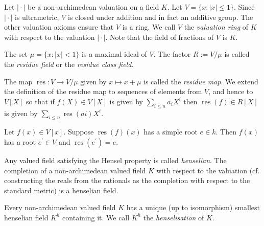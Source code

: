 \documentclass[12pt]{article}
\newcommand{\PR}{^{\prime}}
\DeclareMathOperator{\res}{res}
\newcommand{\val}{|\!\cdot\!|}
\begin{document}
Let $\val$ be a non-archimedean valuation on a field $K$.  Let
$V=\{x:|x|\le 1\}$.  Since $\val$ is ultrametric, $V$ is closed under
addition and in fact an additive group.  The other valuation axioms
ensure that $V$ is a ring.  We call $V$ the \emph{valuation ring} of
$K$ with respect to the valuation $\val$.  Note that the field of
fractions of $V$ is $K$.

The set $\mu=\{x:|x|<1\}$ is a maximal ideal of $V$.  The factor
$R:=V/\mu$ is called the \emph{residue field} or the \emph{residue
class field}.

The map $\res:V \to V/\mu$ given by $x \mapsto x+\mu$ is called the
\emph{residue map}. We extend the definition of the residue map to
sequences of elements from $V$, and hence to $V[X]$ so that if $f(X)
\in V[X]$ is given by $\sum_{i \leq n} a_{i}X^{i}$ then $\res(f) \in
R[X]$ is given by $\sum_{i \leq n} \res(a{i})X^{i}$.

\bigskip

\par{} Let $f(x) \in V[x]$. Suppose
$\res(f)(x)$ has a simple root $e \in k$. Then $f(x)$ has a root $e\PR
\in V$ and $\res(e\PR)=e$.

\medskip

Any valued field satisfying the Hensel property is called
\emph{henselian}. The completion of a non-archimedean valued field $K$
with respect to the valuation (cf. constructing the reals from the
rationals as the completion with respect to the standard metric) is a
henselian field.

Every non-archimedean valued field $K$ has a unique (up to
isomorphism) smallest henselian field $K^h$ containing it. We call
$K^h$ the \emph{henselisation} of $K$.

\end{document}
